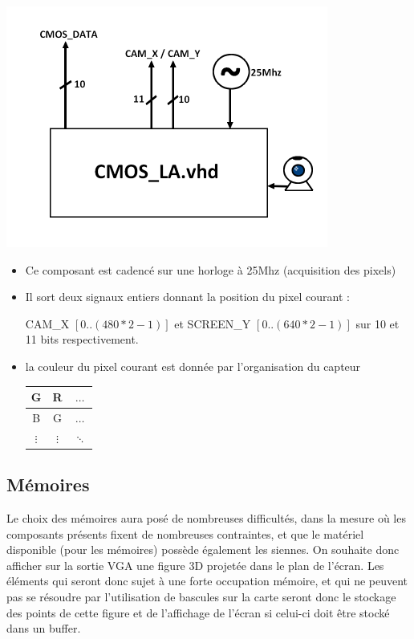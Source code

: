 \documentclass[10pt,a4paper]{report}
\begin{document}
\includegraphics[width=300pt]{gfx/cmos_la.png}
\begin{itemize}
\item Ce composant est cadencé sur une horloge à 25Mhz (acquisition des pixels)
\item Il sort deux signaux entiers donnant la position du pixel courant :

CAM\_X $\left[ 0 .. (480*2-1) \right]$ et SCREEN\_Y $\left[ 0 .. (640*2-1) \right]$ sur 10 et 11 bits respectivement.
\item la couleur du pixel courant est donnée par l'organisation du capteur

\begin{center}
\begin{tabular}{|c|c|c|}
\hline 
G & R & $\ldots$ \\ 
\hline 
B & G & $\ldots$ \\ 
\hline 
$\vdots$ & $\vdots$ & $\ddots$  \\ 
\hline 
\end{tabular} 
\end{center}

\end{itemize}

\subsection{Mémoires}
Le choix des mémoires aura posé de nombreuses difficultés, dans la mesure où les composants présents fixent de nombreuses contraintes, et que le matériel disponible (pour les mémoires) possède également les siennes.
On souhaite donc afficher sur la sortie VGA une figure 3D projetée dans le plan de l'écran. Les éléments qui seront donc sujet à une forte occupation mémoire, et qui ne peuvent pas se résoudre par l'utilisation de bascules sur la carte seront donc le stockage des points de cette figure et de l'affichage de l'écran si celui-ci doit être stocké dans un buffer.
\end{document}
